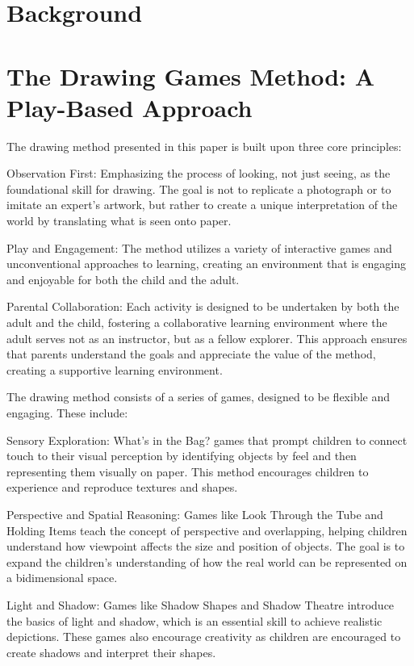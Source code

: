 \documentclass{article}
\begin{document}
\section{Background}
\label{sec:background}




\section{The Drawing Games Method: A Play-Based Approach}
\label{sec:others}

The drawing method presented in this paper is built upon three core principles:

Observation First: Emphasizing the process of looking, not just seeing, as the foundational skill for drawing. The goal is not to replicate a photograph or to imitate an expert’s artwork, but rather to create a unique interpretation of the world by translating what is seen onto paper.

Play and Engagement: The method utilizes a variety of interactive games and unconventional approaches to learning, creating an environment that is engaging and enjoyable for both the child and the adult.

Parental Collaboration: Each activity is designed to be undertaken by both the adult and the child, fostering a collaborative learning environment where the adult serves not as an instructor, but as a fellow explorer. This approach ensures that parents understand the goals and appreciate the value of the method, creating a supportive learning environment.

The drawing method consists of a series of games, designed to be flexible and engaging. These include:

Sensory Exploration: What's in the Bag? games that prompt children to connect touch to their visual perception by identifying objects by feel and then representing them visually on paper. This method encourages children to experience and reproduce textures and shapes.

Perspective and Spatial Reasoning: Games like Look Through the Tube and Holding Items teach the concept of perspective and overlapping, helping children understand how viewpoint affects the size and position of objects. The goal is to expand the children’s understanding of how the real world can be represented on a bidimensional space.

Light and Shadow: Games like Shadow Shapes and Shadow Theatre introduce the basics of light and shadow, which is an essential skill to achieve realistic depictions. These games also encourage creativity as children are encouraged to create shadows and interpret their shapes.
\end{document}
